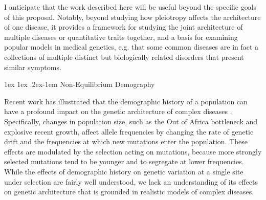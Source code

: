 \message{ !name(ResearchStrategy.tex)}\documentclass[11pt]{article}
\makeatletter
\renewcommand{\paragraph}{%
  \@startsection{paragraph}{4}%
  {\z@}{1ex \@plus 1ex \@minus .2ex}{-1em}%
  {\normalfont\normalsize\bfseries}%
}
\makeatother
\begin{document}

I anticipate that the work described here will be useful beyond the specific goals of this proposal. Notably, beyond studying how pleiotropy affects the architecture of one disease, it provides a framework for studying the joint architecture of multiple diseases or quantitative traits together\cite{Pickrell:2016ko,Zhou:2014kk}, and a basis for examining popular models in medical genetics, e.g. that some common diseases are in fact a collections of multiple distinct but biologically related disorders that present similar symptoms\cite{Gottesman:2003ul, Flint:2006ia, Kendler:2010kw, Mitchell:2012hw}. 



\paragraph{Non-Equilibrium Demography}

Recent work has illustrated that the demographic history of a population can have a profound impact on the genetic architecture of complex diseases \cite{Simons:2014fj,Tennessen:2012ek,Keinan:2012kl, Gao:2014dz, Gazave:2013jh, Lohmueller:2014gd}. Specifically, changes in population size, such as the Out of Africa bottleneck and explosive recent growth, affect allele frequencies\cite{Tennessen:2012ek,Keinan:2012kl} by changing the rate of genetic drift and the frequencies at which new mutations enter the population. These effects are modulated by the selection acting on mutations, because more strongly selected mutations tend to be younger and to segregate at lower frequencies\cite{Simons:2014fj}. While the effects of demographic history on genetic variation at a single site under selection are fairly well understood, we lack an understanding of its effects on genetic architecture that is grounded in realistic models of complex diseases.   
\end{document}

